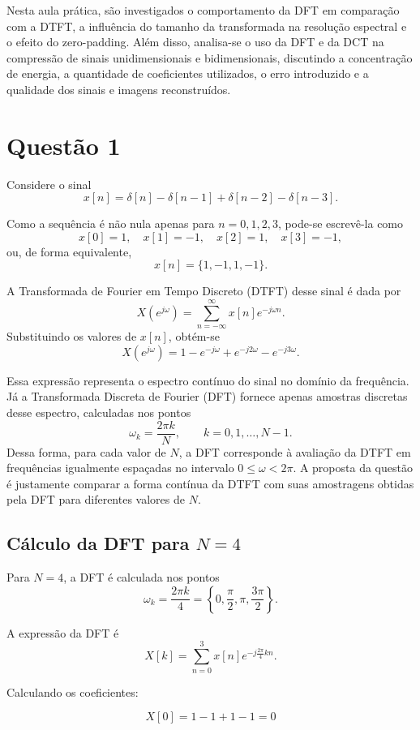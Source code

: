 \documentclass[12pt,a4paper]{article}
\begin{document}
Nesta aula prática, são investigados o comportamento da DFT em comparação com a DTFT, a influência do tamanho da transformada na resolução espectral e o efeito do zero-padding. Além disso, analisa-se o uso da DFT e da DCT na compressão de sinais unidimensionais e bidimensionais, discutindo a concentração de energia, a quantidade de coeficientes utilizados, o erro introduzido e a qualidade dos sinais e imagens reconstruídos.


\section{Questão 1}

Considere o sinal
\[
x[n] = \delta[n] - \delta[n-1] + \delta[n-2] - \delta[n-3].
\]

Como a sequência é não nula apenas para \(n=0,1,2,3\), pode-se escrevê-la como
\[
x[0]=1,\quad x[1]=-1,\quad x[2]=1,\quad x[3]=-1,
\]
ou, de forma equivalente,
\[
x[n]=\{1,-1,1,-1\}.
\]

A Transformada de Fourier em Tempo Discreto (DTFT) desse sinal é dada por
\[
X(e^{j\omega})=\sum_{n=-\infty}^{\infty}x[n]e^{-j\omega n}.
\]
Substituindo os valores de \(x[n]\), obtém-se
\[
X(e^{j\omega})=1-e^{-j\omega}+e^{-j2\omega}-e^{-j3\omega}.
\]

Essa expressão representa o espectro contínuo do sinal no domínio da frequência. Já a Transformada Discreta de Fourier (DFT) fornece apenas amostras discretas desse espectro, calculadas nos pontos
\[
\omega_k=\frac{2\pi k}{N}, \qquad k=0,1,\dots,N-1.
\]
Dessa forma, para cada valor de \(N\), a DFT corresponde à avaliação da DTFT em frequências igualmente espaçadas no intervalo \(0 \leq \omega < 2\pi\). A proposta da questão é justamente comparar a forma contínua da DTFT com suas amostragens obtidas pela DFT para diferentes valores de \(N\).

\subsection{Cálculo da DFT para \(N=4\)}

Para \(N=4\), a DFT é calculada nos pontos
\[
\omega_k=\frac{2\pi k}{4}=\left\{0,\frac{\pi}{2},\pi,\frac{3\pi}{2}\right\}.
\]

A expressão da DFT é
\[
X[k]=\sum_{n=0}^{3}x[n]e^{-j\frac{2\pi}{4}kn}.
\]

Calculando os coeficientes:

\[
X[0]=1-1+1-1=0
\]
\end{document}
